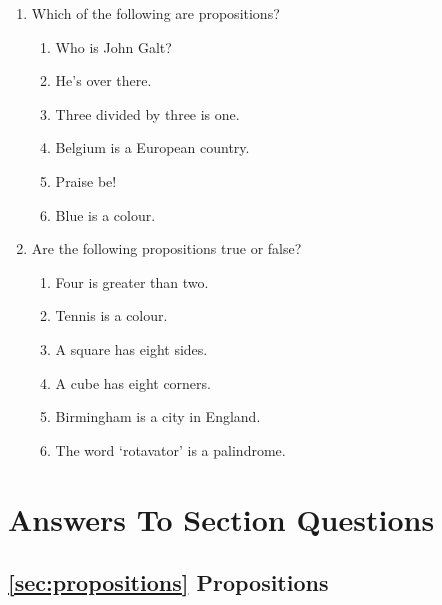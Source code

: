 \documentclass{article}
\begin{document}
      \begin{enumerate} 

        \item Which of the following are propositions?
          \begin{enumerate}
            \item Who is John Galt?
            \item He's over there.
            \item Three divided by three is one.
            \item Belgium is a European country.
            \item Praise be!
            \item Blue is a colour.
          \end{enumerate}

        \item Are the following propositions true or false?
          \begin{enumerate}
            \item Four is greater than two.
            \item Tennis is a colour.
            \item A square has eight sides.
            \item A cube has eight corners.
            \item Birmingham is a city in England.
            \item The word `rotavator' is a palindrome.
          \end{enumerate}

      \end{enumerate}

  \appendix
  \section{Answers To Section Questions}

  \subsection*{\ref{sec:propositions} Propositions}
\end{document}
